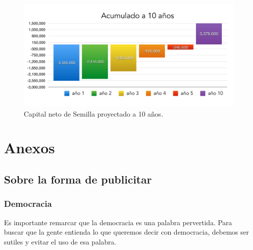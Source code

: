 \documentclass[10pt,letterpaper,oneside]{book}
\begin{document}
\begin{figure}[h]
\begin{center}
\includegraphics[scale=0.4]{10anos1.pdf}
\caption{Capital neto de Semilla proyectado a 10 años.}
\label{Proyeccion10.2}
\end{center}
\end{figure}

\chapter{Anexos}
	\section{Sobre la forma de publicitar} 
	\subsection{Democracia} Es importante remarcar que la democracia es una palabra pervertida. Para buscar que la gente entienda lo que queremos decir con democracia, debemos ser sutiles y evitar el uso de esa palabra.




\end{document}
